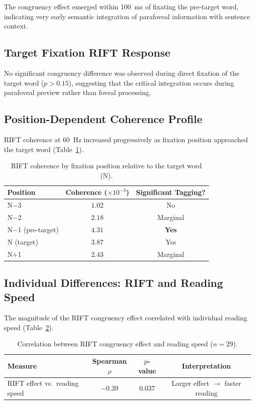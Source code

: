 \documentclass[11pt]{article}
\begin{document}
The congruency effect emerged within 100~ms of fixating the pre-target word, indicating very early semantic integration of parafoveal information with sentence context.

\subsection{Target Fixation RIFT Response}

No significant congruency difference was observed during direct fixation of the target word ($p > 0.15$), suggesting that the critical integration occurs during parafoveal preview rather than foveal processing.

\subsection{Position-Dependent Coherence Profile}

RIFT coherence at 60~Hz increased progressively as fixation position approached the target word (Table~\ref{tab:position}).

\begin{table}[H]
\centering
\caption{RIFT coherence by fixation position relative to the target word (N).}
\label{tab:position}
\begin{tabular}{@{}lcc@{}}
\toprule
Position & Coherence ($\times 10^{-3}$) & Significant Tagging? \\
\midrule
N$-$3 & $1.02$ & No \\
N$-$2 & $2.18$ & Marginal \\
N$-$1 (pre-target) & $4.31$ & \textbf{Yes} \\
N (target) & $3.87$ & Yes \\
N$+$1 & $2.43$ & Marginal \\
\bottomrule
\end{tabular}
\end{table}

\subsection{Individual Differences: RIFT and Reading Speed}

The magnitude of the RIFT congruency effect correlated with individual reading speed (Table~\ref{tab:individual}).

\begin{table}[H]
\centering
\caption{Correlation between RIFT congruency effect and reading speed ($n = 29$).}
\label{tab:individual}
\begin{tabular}{@{}lccc@{}}
\toprule
Measure & Spearman $\rho$ & $p$-value & Interpretation \\
\midrule
RIFT effect vs.\ reading speed & $-0.39$ & $\mathbf{0.037}$ & Larger effect $\rightarrow$ faster reading \\
\bottomrule
\end{tabular}
\end{table}
\end{document}
